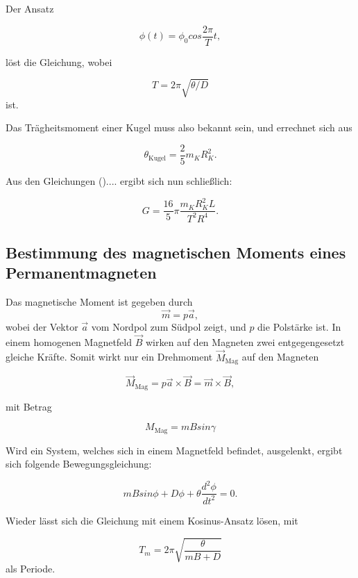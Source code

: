 Der Ansatz

\begin{equation}
  \phi(t) = \phi_0 cos \frac{2\pi}{T}t ,
\end{equation}

löst die Gleichung, wobei

\begin{equation}
  T = 2 \pi \sqrt{\theta/D}  
\end{equation}
ist.

Das Trägheitsmoment einer Kugel muss also bekannt sein, und errechnet sich aus

\begin{equation}
  \theta_\text{Kugel} = \frac{2}{5}m_K R_K^{2} .
\end{equation}

Aus den Gleichungen ().... ergibt sich nun schließlich:

\begin{equation}
 G = \frac{16}{5}\pi \frac{m_K R_K^{2}L}{T^{2}R^{4}} .
\end{equation}


\subsection{Bestimmung des magnetischen Moments eines Permanentmagneten}
Das magnetische Moment ist gegeben durch
\begin{equation}
  \vec{m} = p \vec{a} ,
\end{equation}
wobei der Vektor $\vec{a}$ vom Nordpol zum Südpol zeigt, und $p$ die Polstärke ist.
In einem homogenen Magnetfeld $\vec{B}$ wirken auf den Magneten zwei entgegengesetzt gleiche Kräfte. Somit wirkt nur ein Drehmoment $\vec{M}_\text{Mag}$
auf den Magneten

\begin{equation}
  \vec{M}_\text{Mag} = p \vec{a} \times \vec{B} = \vec{m} \times \vec{B} ,
\end{equation}

mit Betrag

\begin{equation}
 M_\text{Mag} = m B sin\gamma
\end{equation}

Wird ein System, welches sich in einem Magnetfeld befindet, ausgelenkt, ergibt sich folgende Bewegungsgleichung:

\begin{equation}
  m B sin\phi + D \phi + \theta \frac{d^{2}\phi}{dt^{2}} = 0 .
\end{equation}

Wieder lässt sich die Gleichung mit einem Kosinus-Ansatz lösen, mit

\begin{equation}
  T_m = 2\pi \sqrt{\frac{\theta}{m B + D}}
\end{equation}
als Periode.



